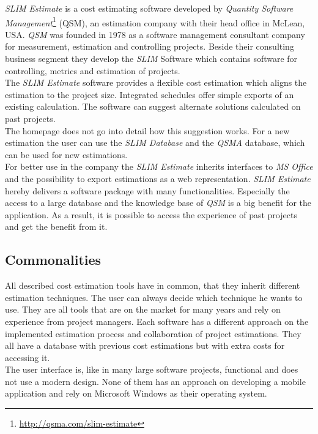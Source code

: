 \textit{SLIM Estimate} is a cost estimating software developed by \textit{Quantity Software Management}\footnote{\url{http://qsma.com/slim-estimate}} (QSM), an estimation company with their head office in McLean, USA. \textit{QSM} was founded in 1978 as a software management consultant company for measurement, estimation and controlling projects. Beside their consulting business segment they develop the \textit{SLIM} Software which contains software for controlling, metrics and estimation of projects.
\\
The \textit{SLIM Estimate} software provides a flexible cost estimation which aligns the estimation to the project size. Integrated schedules offer simple exports of an existing calculation. The software can suggest alternate solutions calculated on past projects.
\\
The homepage does not go into detail how this suggestion works. For a new estimation the user can use the \textit{SLIM Database} and the \textit{QSMA} database, which can be used for new estimations.
\\
For better use in the company the \textit{SLIM Estimate} inherits interfaces to \textit{MS Office} and the possibility to export estimations as a web representation. \textit{SLIM Estimate} hereby delivers a software package with many functionalities. Especially the access to a large database and the knowledge base of \textit{QSM} is a big benefit for the application. As a result, it is possible to access the experience of past projects and get the benefit from it.


\subsection{Commonalities}

All described cost estimation tools have in common, that they inherit different estimation techniques. The user can always decide which technique he wants to use. They are all tools that are on the market for many years and rely on experience from project managers. Each software has a different approach on the implemented estimation process and collaboration of project estimations. They all have a database with previous cost estimations but with extra costs for accessing it.\\
The user interface is, like in many large software projects, functional and does not use a modern design. None of them has an approach on developing a mobile application and rely on Microsoft Windows as their operating system.

